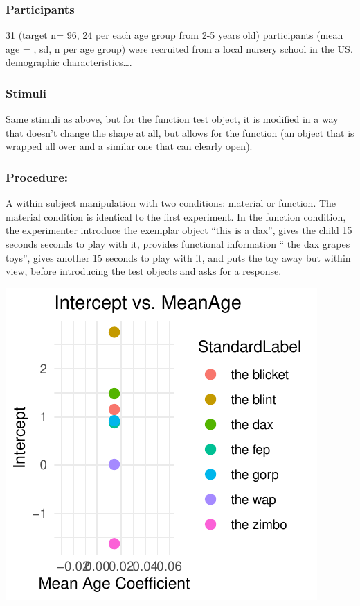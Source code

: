 \documentclass[10pt, letterpaper]{article}
\newenvironment{CodeChunk}{}{}
\begin{document}
\hypertarget{participants-1}{%
\subsubsection{Participants}\label{participants-1}}

31 (target n= 96, 24 per each age group from 2-5 years old) participants
(mean age = , sd, n per age group) were recruited from a local nursery
school in the US. demographic characteristics\ldots.

\hypertarget{stimuli}{%
\subsubsection{Stimuli}\label{stimuli}}

Same stimuli as above, but for the function test object, it is modified
in a way that doesn't change the shape at all, but allows for the
function (an object that is wrapped all over and a similar one that can
clearly open).

\hypertarget{procedure-1}{%
\subsubsection{Procedure:}\label{procedure-1}}

A within subject manipulation with two conditions: material or function.
The material condition is identical to the first experiment. In the
function condition, the experimenter introduce the exemplar object
``this is a dax'', gives the child 15 seconds seconds to play with it,
provides functional information `` the dax grapes toys'', gives another
15 seconds to play with it, and puts the toy away but within view,
before introducing the test objects and asks for a response.

\begin{CodeChunk}

\includegraphics{figs/unnamed-chunk-1-1} \end{CodeChunk}
\end{document}
